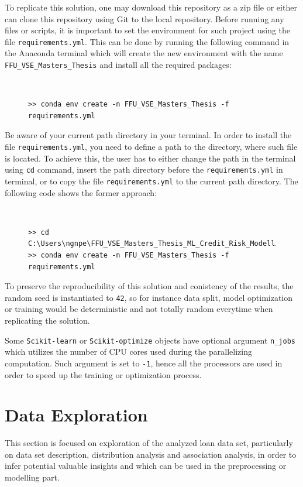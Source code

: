 To replicate this solution, one may download this repository as a zip file or either can clone this repository using Git to the local repository. Before running any files or scripts, it is important to set the environment for such project using the file \texttt{requirements.yml}. This can be done by running the following command in the Anaconda terminal which will create the new environment with the name \texttt{FFU\_VSE\_Masters\_Thesis} and install all the required packages:
\begin{figure}[H]
\centering\
{\footnotesize
\begin{verbatim}
>> conda env create -n FFU_VSE_Masters_Thesis -f requirements.yml    
\end{verbatim}
\vspace{-1em}
}
\end{figure}
Be aware of your current path directory in your terminal. In order to install the file \texttt{requirements.yml}, you need to define a path to the directory, where such file is located.
To achieve this, the user has to either change the path in the terminal using \texttt{cd} command, insert the path directory before the \texttt{requirements.yml} in terminal, or to copy the file \texttt{requirements.yml} to the current path directory. The following code shows the former approach:
\begin{figure}[H]
\centering\
{\footnotesize
\begin{verbatim}
>> cd C:\Users\ngnpe\FFU_VSE_Masters_Thesis_ML_Credit_Risk_Modelling
>> conda env create -n FFU_VSE_Masters_Thesis -f requirements.yml   
\end{verbatim}
\vspace{-1em}
}
\end{figure}


To preserve the reproducibility of this solution and conistency of the results, the random seed is instantiated to \texttt{42}, so for instance data split, model optimization or training would be deterministic and not totally random everytime when replicating the solution.

Some \lstinline{Scikit-learn} or \lstinline{Scikit-optimize} objects have optional argument \texttt{n\_jobs} which utilizes the number of CPU cores used during the parallelizing computation. Such argument is set to \texttt{-1}, hence all the processors are used in order to  speed up the training or optimization process.

\newpage
\section{Data Exploration}
This section is focused on exploration of the analyzed loan data set, particularly on data set description, distribution analysis and association analysis, in order to infer potential valuable insights and which can be used in the preprocessing or modelling part.

